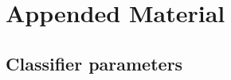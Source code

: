 \documentclass{kththesis}
\begin{document}






\printbibliography[heading=bibintoc]


\appendix

\chapter{Appended Material}

\section{Classifier parameters}


% 


\end{document}
